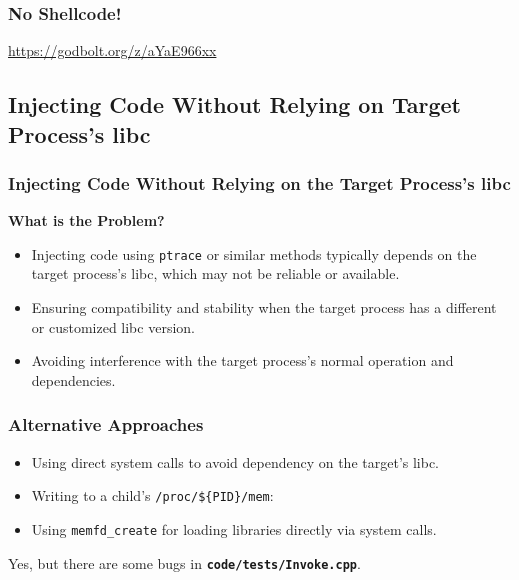 \begin{frame}
    \frametitle{No Shellcode!}
    \url{https://godbolt.org/z/aYaE966xx}
    
\end{frame}

\subsection{Injecting Code Without Relying on Target Process's libc}
\begin{frame}
    \frametitle{Injecting Code Without Relying on the Target Process's libc}
    \textbf{What is the Problem?}
    \begin{itemize}
        \item Injecting code using \texttt{ptrace} or similar methods typically depends on the target process's libc, which may not be reliable or available.
        \item Ensuring compatibility and stability when the target process has a different or customized libc version.
        \item Avoiding interference with the target process's normal operation and dependencies.
    \end{itemize}
\end{frame}

\begin{frame}
    \frametitle{Alternative Approaches}
    \begin{itemize}
        \item Using direct system calls to avoid dependency on the target's libc.
        \item Writing to a child's \texttt{/proc/\$\{PID\}/mem}:
        \item Using \texttt{memfd\_create} for loading libraries directly via system calls.
    \end{itemize}
    Yes, but there are some bugs in \texttt{\textbf{code/tests/Invoke.cpp}}.
\end{frame}

